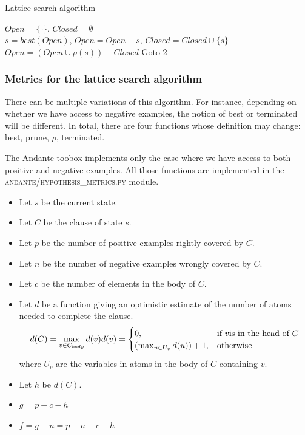 \documentclass{article}
\begin{document}
\begin{algorithm}[H]
\label{algo:latticeSearch}
\caption{Lattice search algorithm}
$Open = \{\square\}$, $Closed = \emptyset$ \\
$s = best(Open)$, $Open = Open - s$, $Closed = Closed \cup \{s\}$  
$Open = (Open \cup \rho(s)) - Closed$ 
Goto 2
\end{algorithm}

\subsubsection{Metrics for the lattice search algorithm} \label{ilp:inductionalgo:metrics}

There can be multiple variations of this algorithm. For instance, depending on
whether we have access to negative examples, the notion of best or terminated
will be different.
In total, there are four functions whose definition may change: best, prune,
$\rho$, terminated.

The Andante toobox implements only the case where we have access to both
positive and negative examples. All those functions are implemented in the
\textsc{andante/hypothesis\_metrics.py} module.

\begin{itemize}
    \item Let $s$ be the current state. 
    \item Let $C$ be the clause of state $s$.
    \item Let $p$ be the number of positive examples rightly covered by $C$.
    \item Let $n$ be the number of negative examples wrongly covered by $C$.
    \item Let $c$ be the number of elements in the body of $C$.
    \item Let $d$ be a function giving an optimistic estimate of the number of
        atoms needed to complete the clause.
            \[
                d(C) = \max_{v \in C_{body}} d(v) \\
                d(v) = 
            \begin{cases}
                0, & \text{if } v \text{is in the head of }C\\
                (\max_{u\in U_v} d(u)) +1,              & \text{otherwise}
            \end{cases}
            \] where $U_v$ are the variables in atoms in the body of $C$ containing $v$.
    \item Let $h$ be $d(C)$.
    \item $g = p-c-h$
    \item $f = g-n = p-n-c-h$
\end{itemize}
\end{document}

